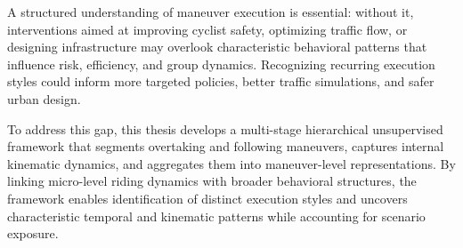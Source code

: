 A structured understanding of maneuver execution is essential: without it, interventions aimed at improving cyclist safety, optimizing traffic flow, or designing infrastructure may overlook characteristic behavioral patterns that influence risk, efficiency, and group dynamics. Recognizing recurring execution styles could inform more targeted policies, better traffic simulations, and safer urban design.

To address this gap, this thesis develops a multi-stage hierarchical unsupervised framework that segments overtaking and following maneuvers, captures internal kinematic dynamics, and aggregates them into maneuver-level representations. By linking micro-level riding dynamics with broader behavioral structures, the framework enables identification of distinct execution styles and uncovers characteristic temporal and kinematic patterns while accounting for scenario exposure.